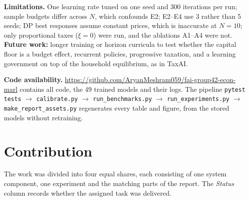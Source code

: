 \documentclass{article}
\begin{document}
\textbf{Limitations.} One learning rate tuned on one seed and 300 iterations per run; sample budgets differ across $N$, which confounds E2; E2--E4 use 3 rather than 5 seeds; DP best responses assume constant prices, which is inaccurate at $N=10$; only proportional taxes ($\xi=0$) were run, and the ablations A1--A4 were not. \textbf{Future work:} longer training or horizon curricula to test whether the capital floor is a budget effect, recurrent policies, progressive taxation, and a learning government on top of the household equilibrium, as in TaxAI.

\textbf{Code availability.} \url{https://github.com/AryanMeshram059/fai-group42-econ-marl} contains all code, the 49 trained models and their logs. The pipeline \texttt{pytest tests} $\rightarrow$ \texttt{calibrate.py} $\rightarrow$ \texttt{run\_benchmarks.py} $\rightarrow$ \texttt{run\_experiments.py} $\rightarrow$ \texttt{make\_report\_assets.py} regenerates every table and figure, from the stored models without retraining.

\section{Contribution}
The work was divided into four equal shares, each consisting of one system component, one experiment and the matching parts of the report. The \emph{Status} column records whether the assigned task was delivered.
\end{document}
